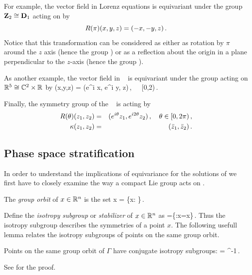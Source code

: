 For example, the vector field in Lorenz equations   is equivariant under the group
$\mathbf{Z}_2\cong\mathbf{D}_1$ acting on  by
\[
	R(\pi)(x,y,z) = (-x,-y,z)\,.
\]
Notice that this transformation can be considered as either as rotation by $\pi$ around the $z$ axis (hence the
group ) or as a reflection about the origin in a plane perpendicular to the $z$-axis (hence the group ).

As another example, the vector field in \CLe\  is equivariant under the group  acting on $\mathbb{R}^{5}\cong \mathbb{C}^{2}\times \mathbb{R}^{}$
by
\beq
 \Rot{\theta} (x,y,z) = (e^{i\theta} x, e^{i\theta} y, z)\,,\ \ \  \theta\in[0,2\pi)\,.
 \label{eq:RotCLe}
\eeq

Finally, the symmetry group of the \AGHe~ is  acting by
\begin{eqnarray*}
  R(\theta)(z_1,z_2) &=& (e^{i\theta} z_1, e^{i 2\theta} z_2)\,,\ \ \  \theta\in[0,2\pi)\,,\\
  \kappa(z_1,z_2) &=& (\bar{z}_1,\bar{z}_2)\,.
\end{eqnarray*}


\subsection{Phase space stratification}

In order to understand the implications of equivariance for the solutions
of  we first have to closely examine the way a compact
Lie group acts on .

 The \emph{group orbit} of $x\in\mathbb{R}^{n}$ is the set
\beq
	\Gamma x = \{\gamma x: \gamma\in\Gamma\}\,.
\eeq

 Define the \emph{isotropy subgroup} or \emph{stabilizer} of $x\in\mathbb{R}^{n}$ as
\beq
	=\{\gamma\in\Gamma:\gamma x=x\}\,.
\eeq
Thus the isotropy subgroup describes the symmetries of a point $x$. The following usefull lemma
relates the isotropy subgroups of points on the same group orbit.

\begin{lemma}
\label{lm:stabGorbit}
Points on the same group orbit of $\Gamma$ have conjugate isotropy subgroups:
\beq
	=\gamma {} \gamma^{-1}\,.
\eeq
\end{lemma}
See  for the proof.

